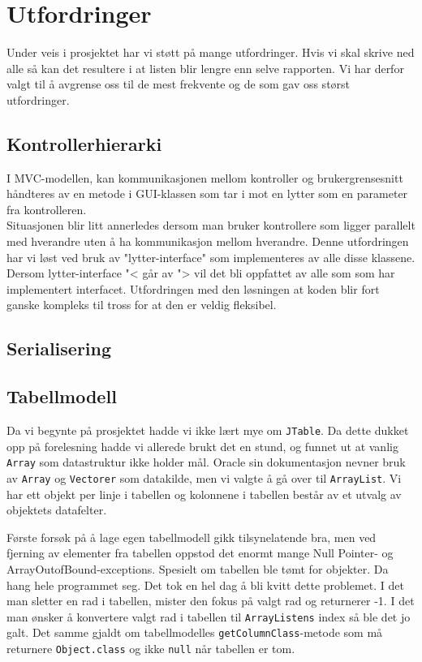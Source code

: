 \section{Utfordringer}
Under veis i prosjektet har vi støtt på mange utfordringer. Hvis vi skal skrive ned alle så kan det resultere i at listen blir lengre enn selve rapporten. Vi har derfor valgt til å avgrense oss til de mest frekvente og de som gav oss størst utfordringer.

\subsection{Kontrollerhierarki}
I MVC-modellen, kan kommunikasjonen mellom kontroller og brukergrensesnitt håndteres av en metode i GUI-klassen som tar i mot en lytter som en parameter fra kontrolleren. \\
Situasjonen blir litt annerledes dersom man bruker kontrollere som ligger parallelt med hverandre uten å ha kommunikasjon mellom hverandre. Denne utfordringen har vi løst ved bruk av "lytter-interface" som implementeres av alle disse klassene. Dersom lytter-interface "< går av "> vil det bli oppfattet av alle som som har implementert interfacet. Utfordringen med den løsningen at koden blir fort ganske kompleks til tross for at den er veldig fleksibel. 
\subsection{Serialisering}
\subsection{Tabellmodell}
Da vi begynte på prosjektet hadde vi ikke lært mye om \texttt{JTable}. Da dette dukket opp på forelesning hadde vi allerede brukt det en stund, og funnet ut at vanlig \texttt{Array} som datastruktur ikke holder mål. Oracle sin dokumentasjon nevner bruk av \texttt{Array} og \texttt{Vectorer} som datakilde, men vi valgte å gå over til \texttt{ArrayList}. Vi har ett objekt per linje i tabellen og kolonnene i tabellen består av et utvalg av objektets datafelter.

Første forsøk på å lage egen tabellmodell gikk tilsynelatende bra, men ved fjerning av elementer fra tabellen oppstod det enormt mange Null Pointer- og ArrayOutofBound-exceptions. Spesielt om tabellen ble tømt for objekter. Da hang hele programmet seg. Det tok en hel dag å bli kvitt dette problemet. I det man sletter en rad i tabellen, mister den fokus på valgt rad og returnerer -1. I det man ønsker å konvertere valgt rad i tabellen til \texttt{ArrayListens} index så ble det jo galt. Det samme gjaldt om tabellmodelles \texttt{getColumnClass}-metode som må returnere \texttt{Object.class} og ikke \texttt{null} når tabellen er tom.

